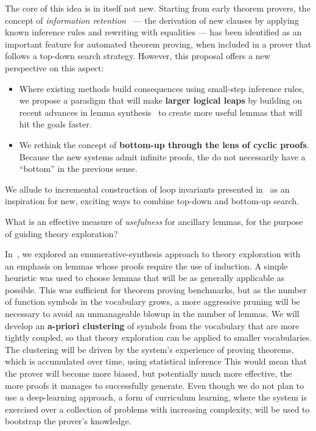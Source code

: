 The core of this idea is in itself not new.
Starting from early theorem provers, the concept of \emph{information retention}~\cite{anatomy-of-vampire} --- the derivation of new clauses by applying known inference rules and rewriting with equalities --- has been identified as an important feature for automated theorem proving, \esp when included in a prover that follows a top-down search strategy.
However, this proposal offers a new perspective on this aspect:
\begin{itemize}
  \item Where existing methods build consequences using small-step inference rules, we propose a paradigm that will make \textbf{larger logical leaps} by building on recent advances in lemma synthesis~\cite{moa,thesy,CAV2021:Murali} to create more useful lemmas that will hit the goals faster.
  \item We rethink the concept of \textbf{bottom-up through the lens of cyclic proofs}.
  Because the new systems admit infinite proofs, the do not necessarily have a ``bottom'' in the previous sense.
\end{itemize}

We allude to incremental construction of loop invariants presented in~\cite{arXiv2020:Padon,FAC2008:Bradley} as an inspiration for new, exciting ways to combine top-down and bottom-up search.


\begin{researchquestion}
What is an effective measure of \emph{usefulness} for ancillary lemmas, for the purpose of guiding theory exploration?
\end{researchquestion}

In~\cite{thesy}, we explored an enumerative-synthesis approach to theory exploration with an emphasis on lemmas whose proofs require the use of induction.
A simple heuristic was used to choose lemmas that will be as generally applicable as possible.
This was sufficient for theorem proving benchmarks, but as the number of function symbols in the vocabulary grows, a more aggressive pruning will be necessary to avoid an unmanageable blowup in the number of lemmas.
We will develop an \textbf{a-priori clustering} of symbols from the vocabulary that are more tightly coupled, so that theory exploration can be applied to smaller vocabularies.
The clustering will be driven by the system's experience of proving theorems, which is accumulated over time, using statistical inference
This would mean that the prover will become more biased, but potentially much more effective, the more proofs it manages to successfully generate.
Even though we do not plan to use a deep-learning approach, a form of curriculum learning, where the system is exercised over a collection of problems with increasing complexity, will be used to bootstrap the prover's knowledge.
